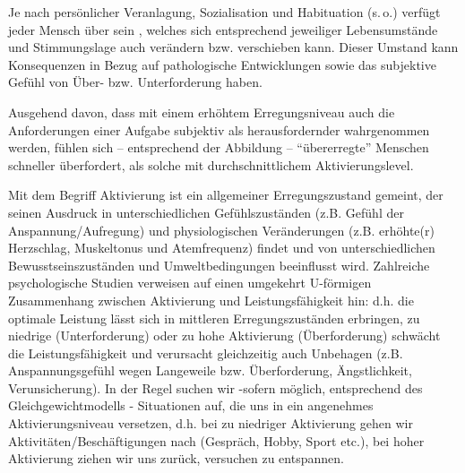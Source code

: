 Je nach persönlicher Veranlagung, Sozialisation und
Habituation (s.\,o.) verfügt jeder Mensch über sein
,
welches sich entsprechend jeweiliger Lebensumstände und
Stimmungslage auch
verändern bzw. verschieben kann. Dieser Umstand kann
Konsequenzen in Bezug auf pathologische Entwicklungen sowie
das subjektive Gefühl von Über- bzw. Unterforderung haben.













% 



Ausgehend davon, dass mit einem erhöhtem Erregungsniveau
auch die Anforderungen einer Aufgabe subjektiv als
herausfordernder wahrgenommen werden, fühlen sich --
entsprechend der Abbildung -- \enquote{übererregte} Menschen
schneller überfordert, als solche mit durchschnittlichem
Aktivierungslevel.


Mit dem Begriff Aktivierung ist ein allgemeiner Erregungszustand gemeint, der seinen Ausdruck in unterschiedlichen Gefühlszuständen (z.B. Gefühl der Anspannung/Aufregung) und physiologischen Veränderungen (z.B. erhöhte(r) Herzschlag, Muskeltonus und Atemfrequenz) findet und von unterschiedlichen Bewusstseinszuständen und Umweltbedingungen beeinflusst wird. Zahlreiche psychologische Studien verweisen auf einen umgekehrt U-förmigen Zusammenhang zwischen Aktivierung und Leistungsfähigkeit hin: d.h. die optimale Leistung lässt sich in mittleren Erregungszuständen erbringen, zu niedrige (Unterforderung) oder zu hohe Aktivierung (Überforderung) schwächt die Leistungsfähigkeit und verursacht gleichzeitig auch Unbehagen (z.B. Anspannungsgefühl wegen Langeweile bzw. Überforderung, Ängstlichkeit, Verunsicherung). In der Regel suchen wir -sofern möglich, entsprechend des Gleichgewichtmodells - Situationen auf, die uns in ein angenehmes Aktivierungsniveau versetzen, d.h. bei zu niedriger Aktivierung gehen wir Aktivitäten/Beschäftigungen nach (Gespräch, Hobby, Sport etc.), bei hoher Aktivierung ziehen wir uns zurück, versuchen zu entspannen.

